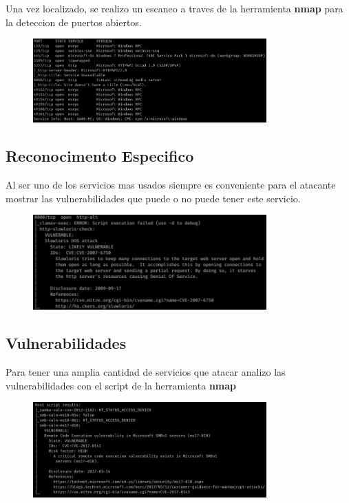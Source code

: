 \documentclass[a4paper]{article}%
\begin{document}
	Una vez localizado, se realizo un escaneo a traves de la herramienta \textbf{nmap}
	para la deteccion de puertos abiertos.

	\begin{figure}[h]
	\includegraphics[width=0.8\textwidth]{images/nmap_comun.jpeg}
	\end{figure}

	\subsection{Reconocimento Especifico}
	Al ser uno de los servicios mas usados siempre es conveniente para el atacante mostrar las vulnerabilidades que puede
	o no puede tener este servicio.
     \begin{figure}[h]
     \includegraphics[width=0.8\textwidth]{images/vuln_80.jpeg}
     \end{figure}
	\newpage

	\subsection{Vulnerabilidades}
	Para tener una amplia cantidad de servicios que atacar analizo las vulnerabilidades con el script de la herramienta 
	\textbf{nmap}
      \begin{figure}[h]
      \includegraphics[width=0.8\textwidth]{images/vuln_scripts.jpeg}
      \end{figure}
\end{document}
